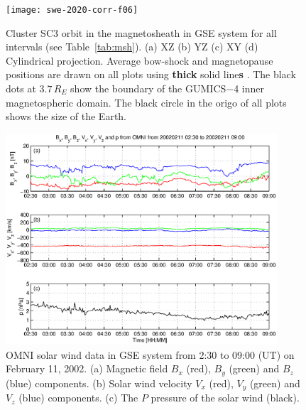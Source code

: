\documentclass[linenumbers,draft]{agujournal}
\begin{document}
\pagebreak

\begin{figure}[h]
\centering
\texttt{[image: swe-2020-corr-f06]}  
\caption{Cluster SC3 orbit in the magnetosheath in GSE system for all intervals (see Table~\ref{tab:msh}). (a) XZ (b) YZ (c) XY (d) Cylindrical projection. Average bow-shock and magnetopause positions are drawn on all plots using \textbf{thick} solid line\textbf{s} \citep[][respectively]{peredo95:_three_alfven_mach,tsyganenko95:_model_earth}. The black dots at $3.7\,R_E$ show the boundary of the GUMICS$-$4 inner magnetospheric domain. The black circle in the origo of all plots shows the size of the Earth.}
\label{fig:mshorbit}
\end{figure}

\pagebreak

\begin{figure}[h]
\centering
\includegraphics[width=0.9\textwidth,angle=0]{swe-2020-corr-f07}  
\caption{OMNI solar wind data in GSE system from 2:30 to 09:00 (UT) on February 11, 2002. (a) Magnetic field $B_{x}$ (red), $B_{y}$ (green) and $B_{z}$ (blue) components. (b) Solar wind velocity $V_{x}$ (red), $V_{y}$ (green) and $V_{z}$ (blue) components. (c) The $P$ pressure of the solar wind (black).}
\label{fig:mshomni}
\end{figure}

\pagebreak
\end{document}
